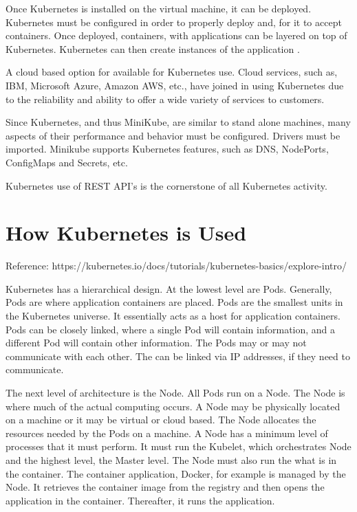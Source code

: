 \documentclass[12pt, letterpaper]{article}
\begin{document}
Once Kubernetes is installed on the virtual machine, it can be
deployed.  Kubernetes must be configured in order to properly deploy
and, for it to accept containers.  Once deployed, containers, with
applications can be layered on top of Kubernetes.  Kubernetes can then
create instances of the application  \cite {hid-sp18-525-concept}.

A cloud based option for available for Kubernetes use.  Cloud
services, such as, IBM, Microsoft Azure, Amazon AWS, etc., have joined
in using Kubernetes due to the reliability and ability to offer a wide
variety of services to customers.   

Since Kubernetes, and thus MiniKube, are similar to stand alone
machines, many aspects of their performance and behavior must be
configured.  Drivers must be imported.  Minikube supports Kubernetes
features, such as DNS, NodePorts, ConfigMaps and Secrets, etc.   

Kubernetes use of REST API's is the cornerstone of all Kubernetes activity.  


\section *{How Kubernetes is Used}
\setlength{\parskip}{1.6em}
Reference:  https://kubernetes.io/docs/tutorials/kubernetes-basics/explore-intro/

Kubernetes has a hierarchical design.  At the lowest level are Pods.
Generally, Pods are where application containers are placed.  Pods are
the smallest units in the Kubernetes universe.  It essentially acts as
a host for application containers.  Pods can be closely linked, where
a single Pod will contain information, and a different Pod will
contain other information.  The Pods may or may not communicate with
each other.  The can be linked via IP addresses, if they need to
communicate.   

The next level of architecture is the Node.  All Pods run on a Node.
The Node is where much of the actual computing occurs.  A Node may be
physically located on a machine or it may be virtual or cloud
based. The Node allocates the resources needed by the Pods on a
machine.  A Node has a minimum level of processes that it must
perform.  It must run the Kubelet, which orchestrates Node and the
highest level, the Master level.  The Node must also run the what is
in the container.  The container application, Docker, for example is
managed by the Node.  It retrieves the container image from the
registry and then opens the application in the container.  Thereafter,
it runs the application. 
\end{document}
